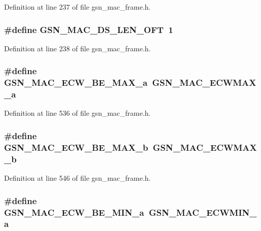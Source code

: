 Definition at line 237 of file gsn\_\-mac\_\-frame.h.

\hypertarget{a00523_ac0635650a96ae3aa5b508094e113727b}{
\subsubsection[{GSN\_\-MAC\_\-DS\_\-LEN\_\-OFT}]{\setlength{\rightskip}{0pt plus 5cm}\#define GSN\_\-MAC\_\-DS\_\-LEN\_\-OFT~1}}
\label{a00523_ac0635650a96ae3aa5b508094e113727b}


Definition at line 238 of file gsn\_\-mac\_\-frame.h.

\hypertarget{a00523_a2d4b61be357a375bea981bf1ecb6264d}{
\subsubsection[{GSN\_\-MAC\_\-ECW\_\-BE\_\-MAX\_\-a}]{\setlength{\rightskip}{0pt plus 5cm}\#define GSN\_\-MAC\_\-ECW\_\-BE\_\-MAX\_\-a~GSN\_\-MAC\_\-ECWMAX\_\-a}}
\label{a00523_a2d4b61be357a375bea981bf1ecb6264d}


Definition at line 536 of file gsn\_\-mac\_\-frame.h.

\hypertarget{a00523_a0baa7df51be4828cc82d54235fa35346}{
\subsubsection[{GSN\_\-MAC\_\-ECW\_\-BE\_\-MAX\_\-b}]{\setlength{\rightskip}{0pt plus 5cm}\#define GSN\_\-MAC\_\-ECW\_\-BE\_\-MAX\_\-b~GSN\_\-MAC\_\-ECWMAX\_\-b}}
\label{a00523_a0baa7df51be4828cc82d54235fa35346}


Definition at line 546 of file gsn\_\-mac\_\-frame.h.

\hypertarget{a00523_a9e518b7c55c5acfb47e72b5e6dd0216b}{
\subsubsection[{GSN\_\-MAC\_\-ECW\_\-BE\_\-MIN\_\-a}]{\setlength{\rightskip}{0pt plus 5cm}\#define GSN\_\-MAC\_\-ECW\_\-BE\_\-MIN\_\-a~GSN\_\-MAC\_\-ECWMIN\_\-a}}
\label{a00523_a9e518b7c55c5acfb47e72b5e6dd0216b}


